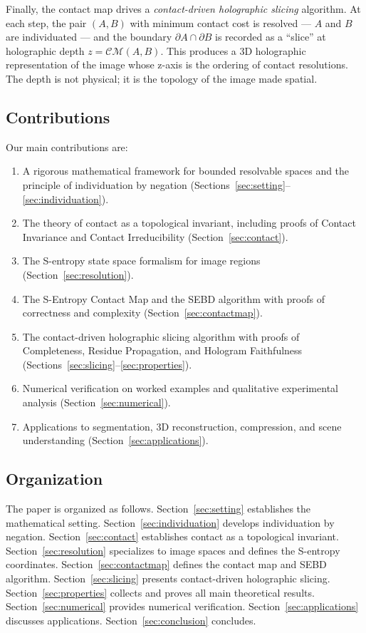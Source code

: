 \documentclass[twocolumn]{article}
\theoremstyle{plain}
\theoremstyle{definition}
\newcommand{\CM}{\mathcal{CM}}
\begin{document}
Finally, the contact map drives a \emph{contact-driven holographic slicing}
algorithm. At each step, the pair $(A,B)$ with minimum contact cost is resolved
--- $A$ and $B$ are individuated --- and the boundary $\partial A \cap \partial B$
is recorded as a ``slice'' at holographic depth $z = \CM(A,B)$. This produces
a 3D holographic representation of the image whose z-axis is the ordering of
contact resolutions. The depth is not physical; it is the topology of the image
made spatial.

\subsection{Contributions}

Our main contributions are:
\begin{enumerate}[label=(\roman*)]
\item A rigorous mathematical framework for bounded resolvable spaces and the
  principle of individuation by negation (Sections~\ref{sec:setting}--\ref{sec:individuation}).
\item The theory of contact as a topological invariant, including proofs of
  Contact Invariance and Contact Irreducibility (Section~\ref{sec:contact}).
\item The S-entropy state space formalism for image regions
  (Section~\ref{sec:resolution}).
\item The S-Entropy Contact Map and the SEBD algorithm with proofs of correctness
  and complexity (Section~\ref{sec:contactmap}).
\item The contact-driven holographic slicing algorithm with proofs of
  Completeness, Residue Propagation, and Hologram Faithfulness
  (Sections~\ref{sec:slicing}--\ref{sec:properties}).
\item Numerical verification on worked examples and qualitative experimental
  analysis (Section~\ref{sec:numerical}).
\item Applications to segmentation, 3D reconstruction, compression, and scene
  understanding (Section~\ref{sec:applications}).
\end{enumerate}

\subsection{Organization}

The paper is organized as follows. Section~\ref{sec:setting} establishes the
mathematical setting. Section~\ref{sec:individuation} develops individuation by
negation. Section~\ref{sec:contact} establishes contact as a topological
invariant. Section~\ref{sec:resolution} specializes to image spaces and defines
the S-entropy coordinates. Section~\ref{sec:contactmap} defines the contact map
and SEBD algorithm. Section~\ref{sec:slicing} presents contact-driven holographic
slicing. Section~\ref{sec:properties} collects and proves all main theoretical
results. Section~\ref{sec:numerical} provides numerical verification.
Section~\ref{sec:applications} discusses applications. Section~\ref{sec:conclusion}
concludes.
\end{document}
